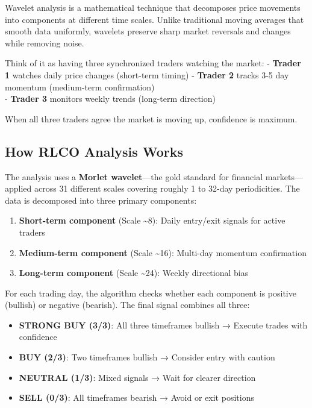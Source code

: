 \documentclass[
  11pt,
]{article}
\providecommand{\tightlist}{%
  \setlength{\itemsep}{0pt}\setlength{\parskip}{0pt}}\usepackage{longtable,booktabs,array}
\begin{document}
Wavelet analysis is a mathematical technique that decomposes price
movements into components at different time scales. Unlike traditional
moving averages that smooth data uniformly, wavelets preserve sharp
market reversals and changes while removing noise.

Think of it as having three synchronized traders watching the market: -
\textbf{Trader 1} watches daily price changes (short-term timing) -
\textbf{Trader 2} tracks 3-5 day momentum (medium-term confirmation)\\
- \textbf{Trader 3} monitors weekly trends (long-term direction)

When all three traders agree the market is moving up, confidence is
maximum.

\subsection{How RLCO Analysis Works}\label{how-rlco-analysis-works}

The analysis uses a \textbf{Morlet wavelet}---the gold standard for
financial markets---applied across 31 different scales covering roughly
1 to 32-day periodicities. The data is decomposed into three primary
components:

\begin{enumerate}
\def\labelenumi{\arabic{enumi}.}
\tightlist
\item
  \textbf{Short-term component} (Scale \textasciitilde8): Daily
  entry/exit signals for active traders
\item
  \textbf{Medium-term component} (Scale \textasciitilde16): Multi-day
  momentum confirmation\\
\item
  \textbf{Long-term component} (Scale \textasciitilde24): Weekly
  directional bias
\end{enumerate}

For each trading day, the algorithm checks whether each component is
positive (bullish) or negative (bearish). The final signal combines all
three:

\begin{itemize}
\tightlist
\item
  \textbf{STRONG BUY (3/3)}: All three timeframes bullish → Execute
  trades with confidence
\item
  \textbf{BUY (2/3)}: Two timeframes bullish → Consider entry with
  caution
\item
  \textbf{NEUTRAL (1/3)}: Mixed signals → Wait for clearer direction
\item
  \textbf{SELL (0/3)}: All timeframes bearish → Avoid or exit positions
\end{itemize}
\end{document}
